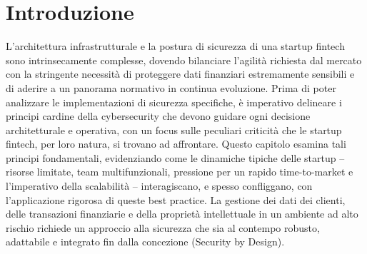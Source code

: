 \section{Introduzione}
L'architettura infrastrutturale e la postura di sicurezza di una startup fintech sono intrinsecamente complesse, dovendo bilanciare l'agilità richiesta dal mercato con la stringente necessità di proteggere dati finanziari estremamente sensibili e di aderire a un panorama normativo in continua evoluzione. Prima di poter analizzare le implementazioni di sicurezza specifiche, è imperativo delineare i principi cardine della cybersecurity che devono guidare ogni decisione architetturale e operativa, con un focus sulle peculiari criticità che le startup fintech, per loro natura, si trovano ad affrontare. Questo capitolo esamina tali principi fondamentali, evidenziando come le dinamiche tipiche delle startup – risorse limitate, team multifunzionali, pressione per un rapido time-to-market e l'imperativo della scalabilità – interagiscano, e spesso confliggano, con l'applicazione rigorosa di queste best practice. La gestione dei dati dei clienti, delle transazioni finanziarie e della proprietà intellettuale in un ambiente ad alto rischio richiede un approccio alla sicurezza che sia al contempo robusto, adattabile e integrato fin dalla concezione (Security by Design).
